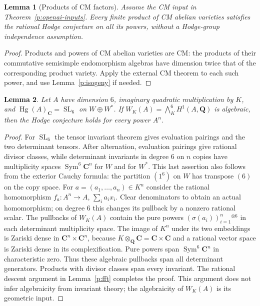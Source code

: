 \documentclass[10pt,reqno]{article}
\theoremstyle{emphasizedplain}
\theoremstyle{emphasizeddefinition}
\theoremstyle{emphasizeddefinition}
\newtheorem{prelemma}{Lemma}
\DeclareMathOperator{\Hg}{Hg}
\DeclareMathOperator{\SL}{SL}
\DeclareMathOperator{\Sym}{Sym}
\newcommand{\Q}{\mathbf Q}
\newcommand{\C}{\mathbf C}
\begin{document}
\begin{prelemma}[Products of CM factors]\label{p:CMproducts-new}
Assume the CM input in Theorem~\ref{p:openai-inputs}. Every finite
product of CM abelian varieties satisfies the rational Hodge conjecture
on all its powers, without a Hodge-group independence assumption.
\end{prelemma}
\begin{proof}
Products and powers of CM abelian varieties are CM: the products of
their commutative semisimple endomorphism algebras have dimension
twice that of the corresponding product variety. Apply the external
CM theorem to each such power, and use Lemma~\ref{p:isogeny} if needed.
\end{proof}

\begin{prelemma}\label{p:polarization}
Let $A$ have dimension $6$, imaginary quadratic multiplication by $K$, and
$\Hg(A)_\C=\SL_6$ on $W\oplus W^*$. If
$W_K(A)=\bigwedge_K^6 H^1(A,\Q)$ is algebraic, then the Hodge conjecture
holds for every power $A^n$.
\end{prelemma}
\begin{proof}
For $\SL_6$ the tensor invariant theorem gives evaluation pairings and the
two determinant tensors. After alternation, evaluation pairings give
rational divisor classes, while determinant invariants in degree $6$ on
$n$ copies have multiplicity spaces $\Sym^6\C^n$ for $W$ and for $W^*$.
This last assertion also follows from the exterior Cauchy formula: the
partition $(1^6)$ on $W$ has transpose $(6)$ on the copy space.
For $a=(a_1,\ldots,a_n)\in K^n$ consider the rational homomorphism
$f_a:A^n\to A$, $\sum_i a_i x_i$. Clear denominators to obtain an actual
homomorphism; on degree $6$ this changes its pullback by a nonzero rational
scalar. The pullbacks of $W_K(A)$ contain the pure powers
$(\sigma(a_i))_{i=1}^n{}^{\otimes6}$ in each determinant multiplicity space.
The image of $K^n$ under its two embeddings is Zariski dense in
$\C^n\times\C^n$, because $K\otimes_\Q\C=\C\times\C$ and a rational
vector space is Zariski dense in its complexification. Pure powers span
$\Sym^6\C^n$ in characteristic zero. Thus these algebraic pullbacks span
all determinant generators. Products with divisor classes span every
invariant. The rational descent argument in Lemma~\ref{p:fft} completes the
proof. This argument does not infer algebraicity from invariant theory;
the algebraicity of $W_K(A)$ is its geometric input.
\end{proof}
\end{document}
